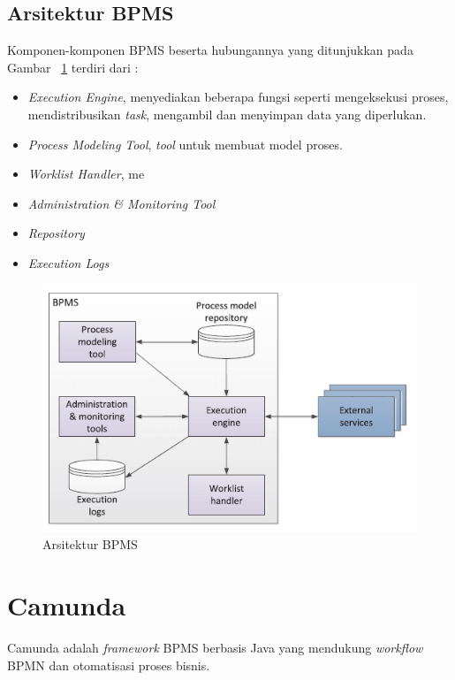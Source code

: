 {\subsection{Arsitektur BPMS}
Komponen-komponen BPMS beserta hubungannya yang ditunjukkan pada Gambar ~\ref{fig:arsitekturbpms} terdiri dari :
\begin{itemize}
	\item \textit{Execution Engine}, menyediakan beberapa fungsi seperti mengeksekusi proses, mendistribusikan \textit{task}, mengambil dan menyimpan data yang diperlukan. 
	\item \textit{Process Modeling Tool}, \textit{tool} untuk membuat model proses.
	\item \textit{Worklist Handler}, me
	\item \textit{Administration & Monitoring Tool}
	\item \textit{Repository}
	\item \textit{Execution Logs}
\end{itemize}
\begin{figure}[H]
	\centering
	\includegraphics[scale=0.5]{Gambar/Bab-2/bpms/bpms}
	\caption{Arsitektur BPMS} 
	\label{fig:arsitekturbpms}
\end{figure}



\section{Camunda}
Camunda adalah \textit{framework} BPMS berbasis Java yang mendukung \textit{workflow} BPMN dan otomatisasi proses bisnis. 

}

